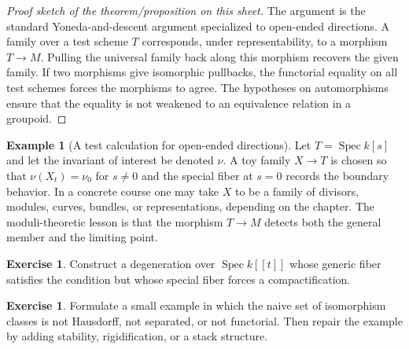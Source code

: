 \documentclass[11pt]{amsart}
\theoremstyle{definition}
\newtheorem{example}[theorem]{Example}
\newtheorem{exercise}[theorem]{Exercise}
\newcommand{\Spec}{\operatorname{Spec}}
\begin{document}
\begin{proof}[Proof sketch of the theorem/proposition on this sheet]
The argument is the standard Yoneda-and-descent argument specialized to open-ended directions.  A family over a test scheme $T$ corresponds, under representability, to a morphism $T\to M$.  Pulling the universal family back along this morphism recovers the given family.  If two morphisms give isomorphic pullbacks, the functorial equality on all test schemes forces the morphisms to agree.  The hypotheses on automorphisms ensure that the equality is not weakened to an equivalence relation in a groupoid.
\end{proof}
\begin{example}[A test calculation for open-ended directions]
Let $T=\Spec k[s]$ and let the invariant of interest be denoted $\nu$.  A toy family $X\to T$ is chosen so that $\nu(X_t)=\nu_0$ for $s\ne0$ and the special fiber at $s=0$ records the boundary behavior.  In a concrete course one may take $X$ to be a family of divisors, modules, curves, bundles, or representations, depending on the chapter.  The moduli-theoretic lesson is that the morphism $T\to M$ detects both the general member and the limiting point.
\end{example}
\begin{exercise}
Construct a degeneration over $\Spec k[[t]]$ whose generic fiber satisfies the condition but whose special fiber forces a compactification.
\end{exercise}
\begin{exercise}
Formulate a small example in which the naive set of isomorphism classes is not Hausdorff, not separated, or not functorial.  Then repair the example by adding stability, rigidification, or a stack structure.
\end{exercise}
\clearpage
\end{document}
